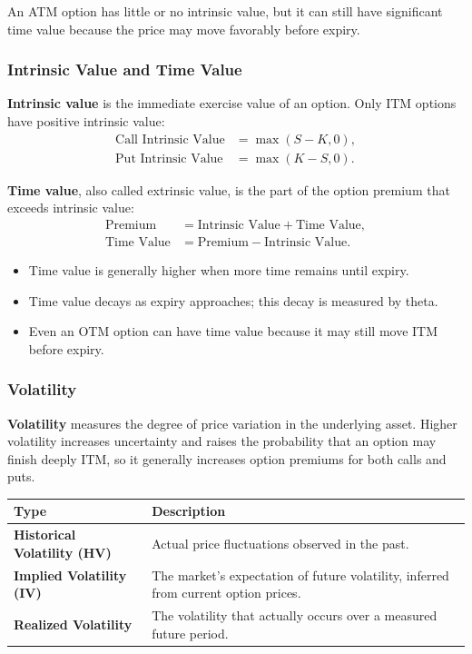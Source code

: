 \documentclass[12pt,openany]{book}
\begin{document}
An ATM option has little or no intrinsic value, but it can still have significant time value because the price may move favorably before expiry.

\subsubsection{Intrinsic Value and Time Value}

\textbf{Intrinsic value} is the immediate exercise value of an option. Only ITM options have positive intrinsic value:
\begin{align*}
    \text{Call Intrinsic Value} &= \max(S - K, 0), \\
    \text{Put Intrinsic Value} &= \max(K - S, 0).
\end{align*}

\textbf{Time value}, also called extrinsic value, is the part of the option premium that exceeds intrinsic value:
\begin{align*}
    \text{Premium} &= \text{Intrinsic Value} + \text{Time Value}, \\
    \text{Time Value} &= \text{Premium} - \text{Intrinsic Value}.
\end{align*}

\begin{itemize}[leftmargin=*]
    \item Time value is generally higher when more time remains until expiry.
    \item Time value decays as expiry approaches; this decay is measured by theta.
    \item Even an OTM option can have time value because it may still move ITM before expiry.
\end{itemize}

\subsubsection{Volatility}

\textbf{Volatility} measures the degree of price variation in the underlying asset. Higher volatility increases uncertainty and raises the probability that an option may finish deeply ITM, so it generally increases option premiums for both calls and puts.

\begin{center}
\small
\begin{tabular}{|L{4cm}|L{10cm}|}
\hline
\textbf{Type} & \textbf{Description} \\
\hline
\textbf{Historical Volatility (HV)} & Actual price fluctuations observed in the past. \\
\hline
\textbf{Implied Volatility (IV)} & The market's expectation of future volatility, inferred from current option prices. \\
\hline
\textbf{Realized Volatility} & The volatility that actually occurs over a measured future period. \\
\hline
\end{tabular}
\end{center}
\end{document}
